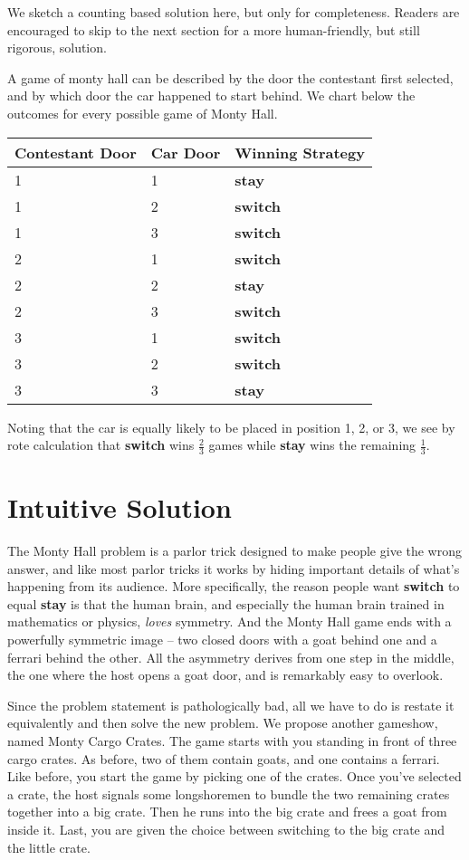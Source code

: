 \documentclass[12pt]{article}
\begin{document}
We sketch a counting based solution here, but only for completeness. Readers are encouraged to skip 
to the next section for a more human-friendly, but still rigorous, solution.

A game of monty hall can be described by the door the contestant first selected, and by which door
the car happened to start behind. We chart below the outcomes for every possible game of Monty Hall.
\begin{center}
\begin{tabular}{l|l|l}
Contestant Door & Car Door & Winning Strategy \\\hline
1 & 1 & \textbf{stay}\\
1 & 2 & \textbf{switch}\\
1 & 3 & \textbf{switch}\\\hline
2 & 1 & \textbf{switch}\\
2 & 2 & \textbf{stay}\\
2 & 3 & \textbf{switch}\\\hline
3 & 1 & \textbf{switch}\\
3 & 2 & \textbf{switch}\\
3 & 3 & \textbf{stay}\\
\end{tabular}
\end{center}
Noting that the car is equally likely to be placed in position 1, 2, or 3, we see by rote calculation
that \textbf{switch} wins $\frac{2}{3}$ games while \textbf{stay} wins the remaining $\frac{1}{3}$.

\section{Intuitive Solution}
The Monty Hall problem is a parlor trick designed to make people give the wrong answer, and like
most parlor tricks it works by hiding important details of what's happening from its audience. More 
specifically, the reason people want \textbf{switch} to equal \textbf{stay} is that the human brain, and especially
the human brain trained in mathematics or physics, \emph{loves} symmetry. And the Monty Hall game
ends with a powerfully symmetric image -- two closed doors with a goat behind one and a ferrari behind 
the other. All the asymmetry derives from one step in the middle, the one where the host opens a goat
door, and is remarkably easy to overlook.

Since the problem statement is pathologically bad, all we have to do is restate it equivalently and
then solve the new problem. We propose another gameshow, named Monty Cargo Crates. The game starts
with you standing in front of three cargo crates. As before, two of them contain goats, and one contains
a ferrari. Like before, you start the game by picking one of the crates. Once you've selected a crate,
the host signals some longshoremen to bundle the two remaining crates together into a big crate. Then
he runs into the big crate and frees a goat from inside it. Last, you are given the choice between
switching to the big crate and the little crate.
\end{document}
